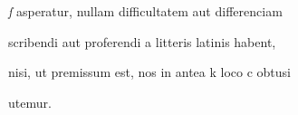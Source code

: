 \textit{ſ} asperatur, nullam difficultatem aut  differenciam 

scribendi aut proferendi a litteris latinis habent, 



\fullpreviouslines


{
\color{blue}

nisi, ut premissum est, nos in antea k loco c obtusi 

utemur. 

}




\endinput



. *8 W rkp.: v. 
ł? W rkp.: singulas.


\catcode `\^^M=5

  \newtip{48}{Łoś niesłusznie uważa, że \textit{bika} w obu wypadkach
    napisano błędnie zamiast \textit{ƀyka}. Przykłady są bowiem podane
    w~pisowni dotychczasowej dla pokazania jej niewystarczalności do
    zróżnicowania wyrazów \textit{bika} i \textit{byka}.} 

\obeylines






\newcommand{\margin}[1]{\annotatetextBlue{\{#1\}}{zapisy na marginesie}}



\renewcommand{\over}[1]{\annotatetextBlue{\{#1\}}{zapisy nad rządkami}}

\newcommand{\add}[1]{\annotatetextOlive{<#1>}{litery i wyrazy dodane, (których w tekście brak)}}

\newcommand{\extra}[1]{\colorbox{magenta!10}{[#1]}}

\newcommand{\overstr}[1]{\annotatetextMagenta{⟦#1⟧}{przekreślenia}}



